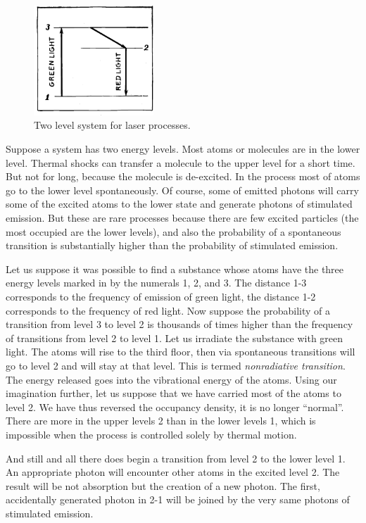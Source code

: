 \begin{figure}[!ht]
\centering
\includegraphics[width=0.4\textwidth]{figures/fig-01-05.pdf}
\caption{Two level system for laser processes.}
\label{fig-1.5}
\end{figure}

Suppose a system has two energy levels. Most atoms or molecules are in the lower level. Thermal shocks can transfer a molecule to the upper level for a short time. But not for long, because the molecule is de-excited. In the process most of atoms go to the lower level spontaneously. Of course, some of emitted photons will carry some of the excited atoms to the lower state and generate photons of stimulated emission. But these are rare processes because there are few excited particles (the most occupied are the lower levels), and also the probability of a spontaneous transition is substantially higher than the probability of stimulated emission.

Let us suppose it was possible to find a substance whose atoms have the three energy levels marked in  by the numerals 1, 2, and 3. The distance 1-3 corresponds to the frequency of emission of green light, the distance 1-2 corresponds to the frequency of red light. Now suppose the probability of a transition from level 3 to level 2 is thousands of times higher than the frequency of transitions from level 2 to level 1. Let us irradiate the substance with green light. The atoms will rise to the third floor, then via spontaneous transitions will go to level 2 and will stay at that level. This is termed \emph{nonradiative transition}. The energy released goes into the vibrational energy of the atoms. Using our imagination further, let us suppose that we have carried most of the atoms to level 2. We have thus reversed the occupancy density, it is no longer ``normal''. There are more in the upper levels 2 than in the lower levels 1, which is impossible when the process is controlled solely by thermal motion.

And still and all there does begin a transition from level 2 to the lower level 1. An appropriate photon will encounter other atoms in the excited level 2. The result will be not absorption but the creation of a new photon. The first, accidentally generated photon in 2-1 will be joined by the very same photons of stimulated emission.

